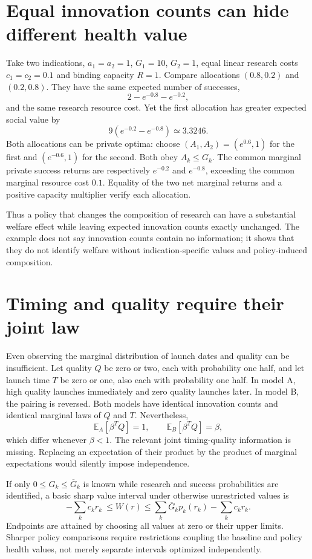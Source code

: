 \documentclass[11pt]{article}
\newcommand{\E}{\mathbb E}
\begin{document}
\section*{Equal innovation counts can hide different health value}
Take two indications, $a_1=a_2=1$, $G_1=10$, $G_2=1$, equal linear research costs $c_1=c_2=0.1$ and binding capacity $R=1$. Compare allocations $(0.8,0.2)$ and $(0.2,0.8)$. They have the same expected number of successes,
\[
 2-e^{-0.8}-e^{-0.2},
\]
and the same research resource cost. Yet the first allocation has greater expected social value by
\[
 9(e^{-0.2}-e^{-0.8})\simeq3.3246.
\]
Both allocations can be private optima: choose $(A_1,A_2)=(e^{0.6},1)$ for the first and $(e^{-0.6},1)$ for the second. Both obey $A_k\leq G_k$. The common marginal private success returns are respectively $e^{-0.2}$ and $e^{-0.8}$, exceeding the common marginal resource cost $0.1$. Equality of the two net marginal returns and a positive capacity multiplier verify each allocation.

Thus a policy that changes the composition of research can have a substantial welfare effect while leaving expected innovation counts exactly unchanged. The example does not say innovation counts contain no information; it shows that they do not identify welfare without indication-specific values and policy-induced composition.

\section*{Timing and quality require their joint law}
Even observing the marginal distribution of launch dates and quality can be insufficient. Let quality $Q$ be zero or two, each with probability one half, and let launch time $T$ be zero or one, also each with probability one half. In model A, high quality launches immediately and zero quality launches later. In model B, the pairing is reversed. Both models have identical innovation counts and identical marginal laws of $Q$ and $T$. Nevertheless,
\[
 \E_A[\beta^TQ]=1,\qquad \E_B[\beta^TQ]=\beta,
\]
which differ whenever $\beta<1$. The relevant joint timing-quality information is missing. Replacing an expectation of their product by the product of marginal expectations would silently impose independence.

If only $0\leq G_k\leq\overline G_k$ is known while research and success probabilities are identified, a basic sharp value interval under otherwise unrestricted values is
\[
 -\sum_kc_kr_k\ \leq W(r)\leq
 \sum_k\overline G_kp_k(r_k)-\sum_kc_kr_k.
\]
Endpoints are attained by choosing all values at zero or their upper limits. Sharper policy comparisons require restrictions coupling the baseline and policy health values, not merely separate intervals optimized independently.
\end{document}
